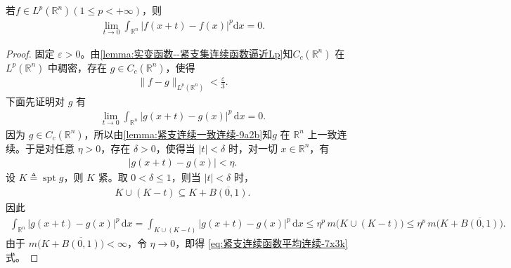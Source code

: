 \documentclass[../../main.tex]{subfiles}%
\begin{document}
\begin{theorem}\label{theorem:Lp范数下平均连续性}
若$f\in L^p(\mathbb{R}^n)(1\leqslant p<+\infty)$，则
\begin{align}
\lim\limits_{t\to0}\int_{\mathbb{R}^n}|f(x+t)-f(x)|^p\mathrm{d}x=0.\label{eq::--9ru90RFUJIJR3ruu0-5}
\end{align}
\end{theorem}
\begin{proof}

固定 \(\varepsilon>0\)。由\cref{lemma:实变函数--紧支集连续函数逼近Lp}知\(C_c(\mathbb{R}^n)\) 在 \(L^p(\mathbb{R}^n)\) 中稠密，存在 \(g\in C_c(\mathbb{R}^n)\)，使得
\begin{align}\label{eq::jJFIOJIOWI23rji2jrsji}
\|f-g\|_{L^p(\mathbb{R}^n)}<\frac{\varepsilon}{3}.
\end{align}
下面先证明对 \(g\) 有
\begin{align}
\lim\limits_{t\to 0}\int_{\mathbb{R}^n}|g(x+t)-g(x)|^p\,\mathrm{d}x=0.
\label{eq:紧支连续函数平均连续-7x3k}
\end{align}
因为 \(g\in C_c(\mathbb{R}^n)\)，所以由\eqref{lemma:紧支连续一致连续-9a2b}知\(g\) 在 \(\mathbb{R}^n\) 上一致连续。于是对任意 \(\eta>0\)，存在 \(\delta>0\)，使得当 \(|t|<\delta\) 时，对一切 \(x\in\mathbb{R}^n\)，有
\begin{align*}
|g(x+t)-g(x)|<\eta.
\end{align*}
设 \(K\triangleq \operatorname{spt} g\)，则 \(K\) 紧。取 \(0<\delta\leqslant 1\)，则当 \(|t|<\delta\) 时，
\begin{align*}
K\cup(K-t)\subseteq K+\overline{B(0,1)}.
\end{align*}
因此
\begin{align*}
\int_{\mathbb{R}^n}|g(x+t)-g(x)|^p\,\mathrm{d}x
=\int_{K\cup(K-t)}|g(x+t)-g(x)|^p\,\mathrm{d}x
\leqslant \eta^p\,m\bigl(K\cup(K-t)\bigr)
\leqslant \eta^p\,m\bigl(K+\overline{B(0,1)}\bigr).
\end{align*}
由于 \(m\bigl(K+\overline{B(0,1)}\bigr)<\infty\)，令 \(\eta\to 0\)，即得 \eqref{eq:紧支连续函数平均连续-7x3k}式。


\end{proof}
\end{document}
